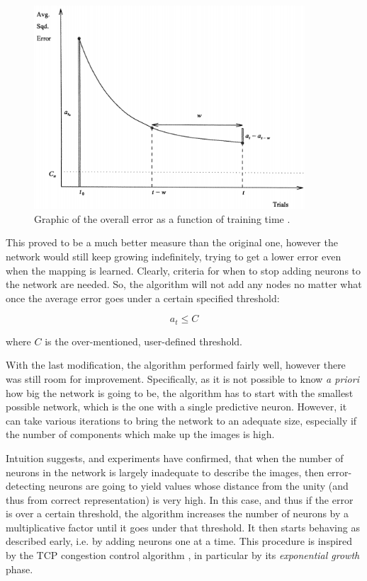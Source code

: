 \documentclass[11pt,a4paper]{report}
\begin{document}
				\begin{figure}[h]
					\centering
					\includegraphics[width=0.9\textwidth]{error}
					\caption{Graphic of the overall error as a function of training time \cite{ash1989dynamic}.}
					\label{fig:error}
				\end{figure}
				
				This proved to be a much better measure than the original one, however the network would still keep growing indefinitely, trying to get a lower error even when the mapping is learned. Clearly, criteria for when to stop adding neurons to the network are needed. So, the algorithm will not add any nodes no matter what once the average error goes under a certain specified threshold:
				
				\begin{equation}
					a_t \leq C
				\end{equation}
				
				where $C$ is the over-mentioned, user-defined threshold.
				
				With the last modification, the algorithm performed fairly well, however there was still room for improvement. Specifically, as it is not possible to know \emph{a priori} how big the network is going to be, the algorithm has to start with the smallest possible network, which is the one with a single predictive neuron. However, it can take various iterations to bring the network to an adequate size, especially if the number of components which make up the images is high.
				
				Intuition suggests, and experiments have confirmed, that when the number of neurons in the network is largely inadequate to describe the images, then error-detecting neurons are going to yield values whose distance from the unity (and thus from correct representation) is very high. In this case, and thus if the error is over a certain threshold, the algorithm increases the number of neurons by a multiplicative factor until it goes under that threshold. It then starts behaving as described early, i.e. by adding neurons one at a time. This procedure is inspired by the TCP congestion control algorithm \cite{allman2009tcp}, in particular by its \emph{{exponential growth}} phase.
				
\end{document}
